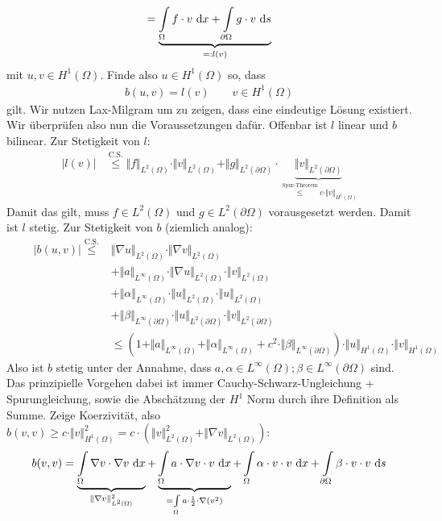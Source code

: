 \begin{lösung}
\begin{align*}
		=\underbrace{\int\limits_\Omega f\cdot v\text{ d} x+\int\limits_{\partial\Omega} g\cdot v\text{ d} s}_{=:l(v)}
	\end{align*}
	mit $u,v\in H^1(\Omega)$. 
	Finde also $u\in H^1(\Omega)$ so, dass
	\begin{align*}
		b(u,v)=l(v)\qquad v\in H^1(\Omega)
	\end{align*} 
	gilt. 
	Wir nutzen Lax-Milgram um zu zeigen, dass eine eindeutige Lösung existiert. 
	Wir überprüfen also nun die Voraussetzungen dafür. 
	Offenbar ist $l$ linear und $b$ bilinear. 
	Zur Stetigkeit von $l$:
	\begin{align*}
		\big|l(v)\big|&\stackrel{\text{C.S.}}{\leq}\Vert f\Vert_{L^2(\Omega)}\cdot\Vert v\Vert_{L^2(\Omega)}+\Vert g\Vert_{L^2(\partial\Omega)}\cdot
		\underbrace{\Vert v\Vert_{L^2(\partial\Omega)}}_{\stackrel{\text{Spur-Theorem}}{\leq} c\cdot\Vert v\Vert_{H^1(\Omega)}}
	\end{align*}
	Damit das gilt, muss $f\in L^2(\Omega)$ und $g\in L^2(\partial\Omega)$ vorausgesetzt werden. 
	Damit ist $l$ stetig.\nl
	Zur Stetigkeit von $b$ (ziemlich analog):
	\begin{align*}
		\qquad\big| b(u,v)\big|\stackrel{\text{C.S.}}{\leq}
		&\Vert\nabla u\Vert_{L^2(\Omega)}\cdot\Vert\nabla v\Vert_{L^2(\Omega)}\\
		&+\Vert a\Vert_{L^\infty(\Omega)}\cdot\Vert\nabla u\Vert_{L^2(\Omega)}\cdot\Vert v\Vert_{L^2(\Omega)} \\
		&+\Vert\alpha\Vert_{L^\infty(\Omega)}\cdot\Vert u\Vert_{L^2(\Omega)}\cdot\Vert u\Vert_{L^2(\Omega)}\\
		&+\Vert\beta\Vert_{L^\infty(\partial\Omega)}\cdot\Vert u\Vert_{L^2(\partial\Omega)}\cdot\Vert v\Vert_{L^2(\partial\Omega)}\\
		&\leq
		\left(1+\Vert a\Vert_{L^\infty(\Omega)}+\Vert\alpha\Vert_{L^\infty(\Omega)}+c^2\cdot\Vert\beta\Vert_{L^\infty(\partial\Omega)}\right)\cdot
		\Vert u\Vert_{H^1(\Omega)}\cdot\Vert v\Vert_{H^1(\Omega)}
	\end{align*}
	Also ist $b$ stetig unter der Annahme, dass $a, \alpha \in L^\infty(\Omega); \beta \in L^\infty(\partial\Omega)$ sind. 
	Das prinzipielle Vorgehen dabei ist immer Cauchy-Schwarz-Ungleichung + Spurungleichung, sowie die Abschätzung der $H^1$ Norm durch ihre Definition als Summe.\nl
	Zeige Koerzivität, also 
	$b(v,v)\geq c\cdot\Vert v\Vert^2_{H^1(\Omega)}=c\cdot\left(\Vert v\Vert^2_{L^2(\Omega)}+\Vert \nabla v\Vert_{L^2(\Omega)}\right)$:
	\begin{align*}
		b(v,v)&=\underbrace{\int\limits_\Omega\nabla v\cdot\nabla v \d x}_{\Vert \nabla v\Vert^2_{L^2(\Omega)}}+\underbrace{\int\limits_\Omega a\cdot\nabla v\cdot v\d x}_{=\int\limits_\Omega a\cdot\frac{1}{2}\cdot\nabla(v^2)}+\int\limits_\Omega\alpha\cdot v\cdot v\d x +\int\limits_{\partial\Omega}\beta\cdot v\cdot v\d s\\

\end{align*}
\end{lösung}
